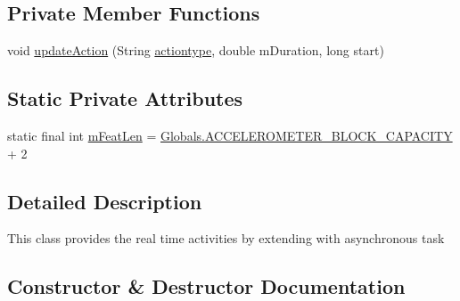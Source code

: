 \subsection*{Private Member Functions}
\begin{DoxyCompactItemize}
\item 
void \hyperlink{classcs_1_1usense_1_1accelerometer_1_1_accelerometer_pipeline_1_1_activity_classification_task_a28c5bf86b2a029e9007aaf8d14c66864}{update\+Action} (String \hyperlink{classcs_1_1usense_1_1accelerometer_1_1_accelerometer_pipeline_a0e1f7822542dab0066358cb0b06906ba}{actiontype}, double m\+Duration, long start)
\end{DoxyCompactItemize}
\subsection*{Static Private Attributes}
\begin{DoxyCompactItemize}
\item 
static final int \hyperlink{classcs_1_1usense_1_1accelerometer_1_1_accelerometer_pipeline_1_1_activity_classification_task_a926b278b90f5c4d61be57202067fd9d8}{m\+Feat\+Len} = \hyperlink{classcs_1_1usense_1_1accelerometer_1_1_globals_a5a685e102e42404d2f1d12d47edc46af}{Globals.\+A\+C\+C\+E\+L\+E\+R\+O\+M\+E\+T\+E\+R\+\_\+\+B\+L\+O\+C\+K\+\_\+\+C\+A\+P\+A\+C\+I\+T\+Y} + 2
\end{DoxyCompactItemize}


\subsection{Detailed Description}
This class provides the real time activities by extending with asynchronous task 

\subsection{Constructor \& Destructor Documentation}
\hypertarget{classcs_1_1usense_1_1accelerometer_1_1_accelerometer_pipeline_1_1_activity_classification_task_a68c787c2575b05db6f8c0d53c0ba1312}{}
